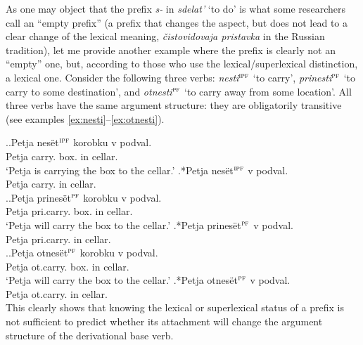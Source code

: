 As one may object that the prefix \textit{s-}   in \textit{sdelat'} `to do' is what some researchers call an ``empty prefix'' (a prefix that changes the aspect, but does not lead to a clear change of the lexical meaning, \textit{\v{c}istovidovaja pristavka} in the Russian tradition), let me provide another example where the prefix is clearly not an ``empty'' one, but, according to those who use the lexical/superlexical distinction, a lexical one.  Consider the following three verbs: \textit{nesti}$^{\textsc{ipf}}$ `to carry', \textit{prinesti}$^{\textsc{pf}}$ `to carry to some destination',  and \textit{otnesti}$^{\textsc{pf}}$ `to carry away from some location'. All three verbs have the same argument structure: they are obligatorily transitive (see examples \ref{ex:nesti}--\ref{ex:otnesti}).

\ex.\label{ex:nesti}\ag.Petja nes\"{e}t$^{\textsc{ipf}}$ korobku v podval.\\
Petja carry. box. in cellar.\\
\trans `Petja is carrying the box to the cellar.'
\bg.*Petja nes\"{e}t$^{\textsc{ipf}}$ v podval.\\
Petja carry. in cellar.\\

\ex.\label{ex:prinesti}\ag.Petja prines\"{e}t$^{\textsc{pf}}$ korobku v podval.\\
Petja pri.carry. box. in cellar.\\
\trans `Petja will carry the box to the cellar.'
\bg.*Petja prines\"{e}t$^{\textsc{pf}}$ v podval.\\
Petja pri.carry. in cellar.\\

\ex.\label{ex:otnesti}\ag.Petja otnes\"{e}t$^{\textsc{pf}}$ korobku v podval.\\
Petja ot.carry. box. in cellar.\\
\trans `Petja will carry the box to the cellar.'
\bg.*Petja otnes\"{e}t$^{\textsc{pf}}$ v podval.\\
Petja ot.carry. in cellar.\\

This clearly shows that knowing the lexical or superlexical status of a prefix is not sufficient to predict whether its attachment will change the argument structure of the derivational base verb.
